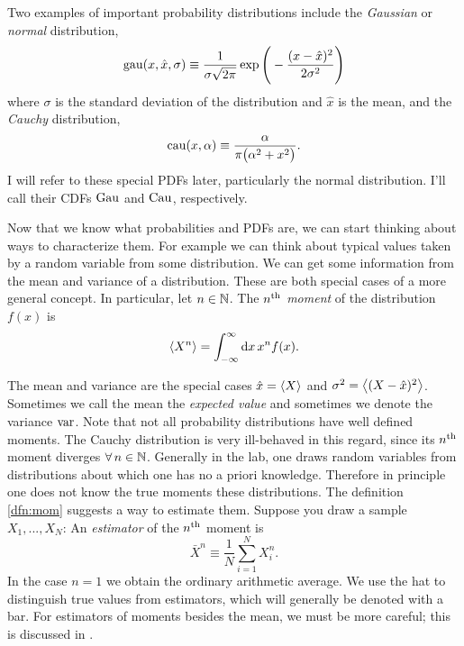 \begin{example*}{}{}
Two examples of important probability distributions include the {\it Gaussian}
or {\it normal} distribution,
\begin{equation}
  \operatorname{gau}(x,\hat{x},\sigma)\equiv\frac{1}{\sigma\sqrt{2\pi}}
  \exp\Bigg(-\frac{(x-\hat{x})^2}{2\sigma^2}\Bigg)
\end{equation}
where $\sigma$ is the standard deviation of the distribution and $\hat{x}$ is 
the mean, and the {\it Cauchy}  distribution,
\begin{equation}
  \operatorname{cau}(x,\alpha)\equiv\frac{\alpha}{\pi\big(\alpha^2+x^2\big)}.
\end{equation}
I will refer to these special PDFs later, particularly the normal distribution.
I'll call their CDFs $\operatorname{Gau}$ and $\operatorname{Cau}$, respectively.   
\end{example*}

Now that we know what probabilities and PDFs are, we can start thinking about
ways to characterize them. For example we can think about typical values taken
by a random variable from some distribution. We can get some information
from the mean and variance of a distribution. These are
both special cases of a more general concept.
In particular, let $n\in\mathbb{N}$.
  The {\it $n{}^{\rm th}$ moment} of the distribution $f(x)$ is
  \begin{equation}\label{dfn:mom}
    \ev{X^n}=\int_{-\infty}^\infty\dd{x}x^nf(x).
  \end{equation}

The mean and variance are the special cases $\hat{x}=\ev{X}$ and 
$\sigma^2=\ev{(X-\hat{x})^2}$. Sometimes we call the mean the {\it expected
value} and sometimes we denote the variance $\operatorname{var}$. Note that not all 
probability distributions have well defined moments. The Cauchy distribution is
very ill-behaved in this regard, since its $n{}^{\rm th}$ moment diverges
$\operatorname{\forall} n\in\mathbb{N}$.
Generally in the lab, one draws random variables from distributions
about which one has no a priori knowledge. Therefore in principle one
does not know the true moments these distributions. The
definition \eqref{dfn:mom} suggests a way to estimate them. 
Suppose you draw a sample $X_1,...,X_N$:
  An {\it estimator} of the $n{}^{\rm th}$ moment is
  \begin{equation}
    \bar{X}^n\equiv\frac{1}{N}\sum_{i=1}^N X_i^n.
  \end{equation}
In the case $n=1$ we obtain the ordinary arithmetic average.
We use the hat to distinguish true values from estimators, which will
generally be denoted with a bar. For estimators of moments besides the
mean, we must be more careful; this is discussed in .

